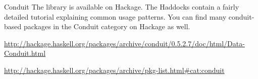 \begin{hcarentry}[updated]{Conduit}
The library is available on Hackage. The Haddocks contain a fairly detailed tutorial explaining common usage patterns. You can find many conduit-based packages in the Conduit category on Hackage as well.

\FurtherReading
\begin{compactitem}
\item \url{http://hackage.haskell.org/packages/archive/conduit/0.5.2.7/doc/html/Data-Conduit.html}
\item \url{http://hackage.haskell.org/packages/archive/pkg-list.html#cat:conduit}
\end{compactitem}
\end{hcarentry}
